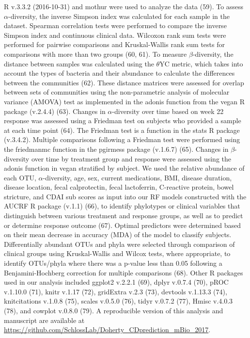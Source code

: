 \documentclass[12pt,]{article}
\begin{document}
R v.3.3.2 (2016-10-31) and mothur were used to analyze the data (59). To
assess \({\alpha}\)-diversity, the inverse Simpson index was calculated
for each sample in the dataset. Spearman correlation tests were
performed to compare the inverse Simpson index and continuous clinical
data. Wilcoxon rank sum tests were performed for pairwise comparisons
and Kruskal-Wallis rank sum tests for comparisons with more than two
groups (60, 61). To measure \({\beta}\)-diversity, the distance between
samples was calculated using the \({\theta}\)YC metric, which takes into
account the types of bacteria and their abundance to calculate the
differences between the communities (62). These distance matrices were
assessed for overlap between sets of communities using the
non-parametric analysis of molecular variance (AMOVA) test as
implemented in the adonis function from the vegan R package (v.2.4.4)
(63). Changes in \({\alpha}\)-diversity over time based on week 22
response was assessed using a Friedman test on subjects who provided a
sample at each time point (64). The Friedman test is a function in the
stats R package (v.3.4.2). Multiple comparisons following a Friedman
test were performed using the friedmanmc function in the pgirmess
package (v.1.6.7) (65). Changes in \({\beta}\)-diversity over time by
treatment group and response were assessed using the adonis function in
vegan stratified by subject. We used the relative abundance of each OTU,
\({\alpha}\)-diversity, age, sex, current medications, BMI, disease
duration, disease location, fecal calprotectin, fecal lactoferrin,
C-reactive protein, bowel stricture, and CDAI sub scores as input into
our RF models constructed with the AUCRF R package (v.1.1) (66), to
identify phylotypes or clinical variables that distinguish between
various treatment and response groups, as well as to predict or
determine response outcome (67). Optimal predictors were determined
based on their mean decrease in accuracy (MDA) of the model to classify
subjects. Differentially abundant OTUs and phyla were selected through
comparison of clinical groups using Kruskal-Wallis and Wilcox tests,
where appropriate, to identify OTUs/phyla where there was a p-value less
than 0.05 following a Benjamini-Hochberg correction for multiple
comparisons (68). Other R packages used in our analysis included ggplot2
v.2.2.1 (69), dplyr v.0.7.4 (70), pROC v.1.10.0 (71), knitr v.1.17 (72),
gridExtra v.2.3 (73), devtools v.1.13.3 (74), knitcitations v.1.0.8
(75), scales v.0.5.0 (76), tidyr v.0.7.2 (77), Hmisc v.4.0.3 (78), and
cowplot v.0.8.0 (79). A reproducible version of this analysis and
manuscript are available at
\url{https://github.com/SchlossLab/Doherty_CDprediction_mBio_2017}.
\end{document}
